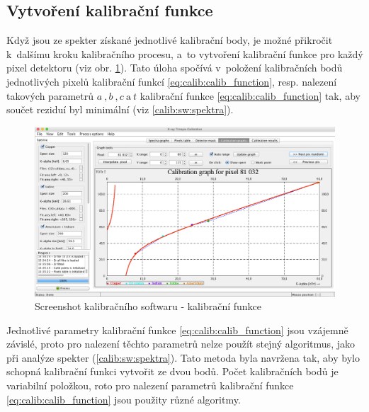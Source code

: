 \subsection{Vytvoření kalibrační funkce}
Když jsou ze spekter získané jednotlivé kalibrační body, je možné přikročit k~dalšímu kroku kalibračního procesu, a~to vytvoření kalibrační funkce pro každý pixel detektoru (viz obr. \ref{fig:calib:sw_calib_function}). Tato úloha spočívá v~položení kalibračních bodů jednotlivých pixelů kalibrační funkcí \ref{eq:calib:calib_function}, resp. nalezení takových parametrů $a~,b~,c~\text{a}~t$ kalibrační funkce \ref{eq:calib:calib_function} tak, aby součet reziduí byl minimální (viz \ref{calib:sw:spektra}).

\begin{figure}[t]
	\begin{center}
		\includegraphics[width=15cm]{figures/calibsw_cc.png}
		\caption{Screenshot kalibračního softwaru - kalibrační funkce}
		\label{fig:calib:sw_calib_function}
	\end{center}
\end{figure}

Jednotlivé parametry kalibrační funkce \ref{eq:calib:calib_function} jsou vzájemně závislé, proto pro nalezení těchto parametrů nelze použít stejný algoritmus, jako při analýze spekter (\ref{calib:sw:spektra}). Tato metoda byla navržena tak, aby bylo schopná kalibrační funkci vytvořit ze dvou bodů. Počet kalibračních bodů je variabilní položkou, roto pro nalezení parametrů kalibrační funkce \ref{eq:calib:calib_function} jsou použity různé algoritmy.

